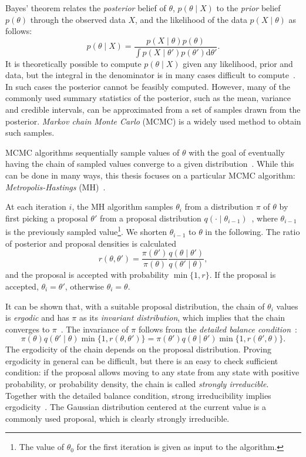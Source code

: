 \documentclass[english,twoside,openright]{HYgraduMLDS}
\newcommand{\dx}{\mathrm{d}}
\begin{document}
Bayes' theorem relates the \emph{posterior} belief of \(\theta\),
\(p(\theta \mid X)\) to the \emph{prior} belief \(p(\theta)\) through the 
observed data \(X\), and the likelihood of the data \(p(X\mid \theta)\) as follows:
\[
    p(\theta \mid X) = \frac{p(X \mid \theta)p(\theta)}
    {\int p(X\mid \theta')p(\theta')\dx\theta'}.
\]
It is theoretically possible to compute \(p(\theta \mid X)\) given any 
likelihood, prior and data, but the integral in the denominator is in many 
cases difficult to compute~\cite{BDA}. In such cases the posterior cannot be feasibly 
computed. However, many of the commonly used summary statistics of the posterior, 
such as the mean, variance and credible intervals, can be approximated from 
a set of samples drawn from the posterior. \emph{Markov chain Monte Carlo}
(MCMC) is a widely used method to obtain such samples.

MCMC algorithms sequentially sample values of \(\theta\)
with the goal of eventually having the chain of sampled values converge to 
a given distribution~\cite{Robert04}. While this can be done in many ways, this thesis
focuses on a particular MCMC algorithm:
\emph{Metropolis-Hastings} (MH)~\cite{MRR53, Has70}.

At each iteration \(i\), the MH algorithm samples \(\theta_i\)
from a distribution \(\pi\) of \(\theta\)
by first picking a proposal \(\theta'\) from a proposal 
distribution \(q(\cdot \mid \theta_{i-1})\)~\cite{MRR53}, where \(\theta_{i-1}\) is the
previously sampled value\footnote{
    The value of \(\theta_0\) for the first iteration is given as input to the 
    algorithm.
}. We shorten \(\theta_{i-1}\) to \(\theta\) in the following. 
The ratio of posterior and proposal densities is calculated
\[
    r(\theta, \theta') = \frac{\pi(\theta')}{\pi(\theta)}
    \frac{q(\theta\mid \theta')}{q(\theta'\mid \theta)},
\]
and the proposal is accepted with probability \(\min\{1, r\}\). 
If the proposal is accepted, 
\(\theta_i = \theta'\), otherwise \(\theta_i = \theta\).

It can be shown that, with a suitable proposal distribution, the chain of
\(\theta_i\) values is \emph{ergodic} and has \(\pi\) as its \emph{invariant
distribution}, which implies that the chain converges to \(\pi\)~\cite{Has70}.
The invariance of \(\pi\) follows from the \emph{detailed balance condition}~\cite{Robert04}:
\[
  \pi(\theta)q(\theta'\mid \theta)\min\{1, r(\theta, \theta')\}
  = \pi(\theta')q(\theta\mid \theta')\min\{1, r(\theta', \theta)\}.
\]
The ergodicity of the chain depends on the proposal distribution. Proving
ergodicity in general can be difficult, but there is an easy to check
sufficient condition: if the proposal allows moving to any state from any
state with positive probability, or probability density, the chain is called
\emph{strongly irreducible}. Together with the detailed balance condition,
strong irreducibility implies ergodicity~\cite{Robert04}. The Gaussian
distribution centered
at the current value is a commonly used proposal, which is clearly
strongly irreducible.
\end{document}
